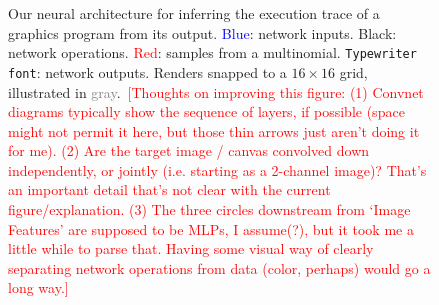 \documentclass{article}
\newcommand{\remark}[1]{\textcolor{red}{[#1]}}
\begin{document}
\begin{figure}
\caption{Our neural architecture for inferring the execution trace of a graphics program from its output. \textcolor{blue}{Blue}: network inputs. Black: network operations. \textcolor{red}{Red}: samples from a multinomial. \texttt{Typewriter font}: network outputs. Renders snapped to a $16\times 16$ grid, illustrated in \textcolor{gray}{gray}.~\remark{Thoughts on improving this figure: (1) Convnet diagrams typically show the sequence of layers, if possible (space might not permit it here, but those thin arrows just aren't doing it for me). (2) Are the target image / canvas convolved down independently, or jointly (i.e. starting as a 2-channel image)? That's an important detail that's not clear with the current figure/explanation. (3) The three circles downstream from `Image Features' are supposed to be MLPs, I assume(?), but it took me a little while to parse that. Having some visual way of clearly separating network operations from data (color, perhaps) would go a long way.}}  \label{architecture}
\end{figure}
\end{document}
